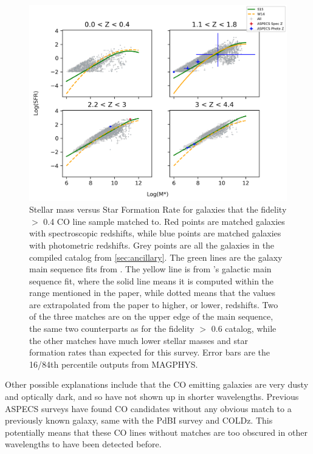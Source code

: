 \begin{figure}[!htbp]
\centering \includegraphics[width=120mm]{No_Cut_Mstar_vs_SFR_all_closest_sep_1_0_sn_fid_40.png}
\caption{Stellar mass versus Star Formation Rate for galaxies that the fidelity $>$ 0.4 CO line sample matched to. Red points are matched galaxies with spectroscopic redshifts, while blue points are matched galaxies with photometric redshifts. Grey points are all the galaxies in the compiled catalog from \ref{sec:ancillary}. The green lines are the galaxy main sequence fits from \cite{schreiber2015herschel}. The yellow line is from \cite{Whitaker_2014}'s galactic main sequence fit, where the solid line means it is computed within the range mentioned in the paper, while dotted means that the values are extrapolated from the paper to higher, or lower, redshifts. Two of the three matches are on the upper edge of the main sequence, the same two counterparts as for the fidelity $>$ 0.6 catalog, while the other matches have much lower stellar masses and star formation rates than expected for this survey. Error bars are the 16/84th percentile outputs from MAGPHYS.}
\label{fig:fid_40_cross}
\end{figure}


Other possible explanations include that the CO emitting galaxies are very dusty and optically dark, and so have not shown up in shorter wavelengths. Previous ASPECS surveys have found CO candidates without any obvious match to a previously known galaxy, same with the PdBI survey and COLDz. This potentially means that these CO lines without matches are too obscured in other wavelengths to have been detected before. 


